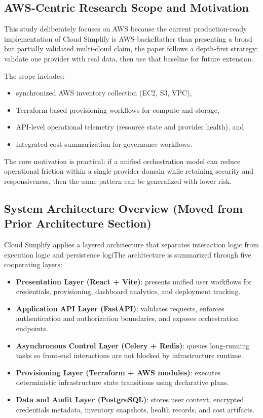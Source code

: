 \subsection{AWS-Centric Research Scope and Motivation}
This study deliberately focuses on AWS because the current production-ready implementation of Cloud Simplify is AWS-backeRather than presenting a broad but partially validated multi-cloud claim, the paper follows a depth-first strategy: validate one provider with real data, then use that baseline for future extension.

The scope includes:
\begin{itemize}
    \item synchronized AWS inventory collection (EC2, S3, VPC),
    \item Terraform-based provisioning workflows for compute and storage,
    \item API-level operational telemetry (resource state and provider health), and
    \item integrated cost summarization for governance workflows.
\end{itemize}

The core motivation is practical: if a unified orchestration model can reduce operational friction within a single provider domain while retaining security and responsiveness, then the same pattern can be generalized with lower risk.

\subsection{System Architecture Overview (Moved from Prior Architecture Section)}
Cloud Simplify applies a layered architecture that separates interaction logic from execution logic and persistence logiThe architecture is summarized through five cooperating layers:
\begin{itemize}
    \item \textbf{Presentation Layer (React + Vite)}: presents unified user workflows for credentials, provisioning, dashboard analytics, and deployment tracking.
    \item \textbf{Application API Layer (FastAPI)}: validates requests, enforces authentication and authorization boundaries, and exposes orchestration endpoints.
    \item \textbf{Asynchronous Control Layer (Celery + Redis)}: queues long-running tasks so front-end interactions are not blocked by infrastructure runtime.
    \item \textbf{Provisioning Layer (Terraform + AWS modules)}: executes deterministic infrastructure state transitions using declarative plans.
    \item \textbf{Data and Audit Layer (PostgreSQL)}: stores user context, encrypted credentials metadata, inventory snapshots, health records, and cost artifacts.
\end{itemize}

